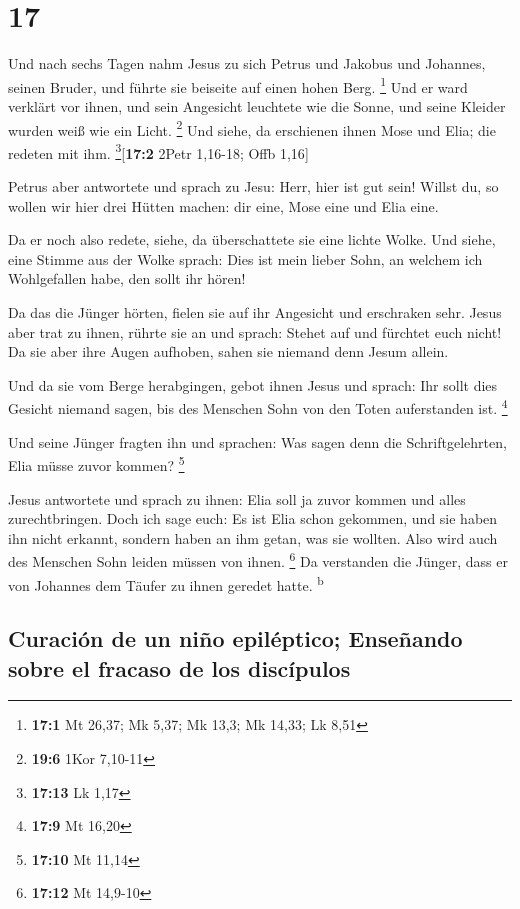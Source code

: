 \hypertarget{section-16}{%
\section{17}\label{section-16}}

 Und nach sechs Tagen nahm Jesus zu sich Petrus und
Jakobus und Johannes, seinen Bruder, und führte sie beiseite auf einen
hohen Berg. \footnote{\textbf{17:1} Mt 26,37; Mk 5,37; Mk 13,3; Mk
  14,33; Lk 8,51}  Und er ward verklärt vor ihnen, und
sein Angesicht leuchtete wie die Sonne, und seine Kleider wurden weiß
wie ein Licht. \footnote{\textbf{19:6} 1Kor 7,10-11}  Und
siehe, da erschienen ihnen Mose und Elia; die redeten mit ihm.
\footnote{\textbf{17:13} Lk 1,17}{[}\textbf{17:2} 2Petr 1,16-18; Offb
1,16{]}

 Petrus aber antwortete und sprach zu Jesu: Herr, hier ist
gut sein! Willst du, so wollen wir hier drei Hütten machen: dir eine,
Mose eine und Elia eine.

 Da er noch also redete, siehe, da überschattete sie eine
lichte Wolke. Und siehe, eine Stimme aus der Wolke sprach: Dies ist mein
lieber Sohn, an welchem ich Wohlgefallen habe, den sollt ihr hören!

 Da das die Jünger hörten, fielen sie auf ihr Angesicht
und erschraken sehr.  Jesus aber trat zu ihnen, rührte sie
an und sprach: Stehet auf und fürchtet euch nicht!  Da sie
aber ihre Augen aufhoben, sahen sie niemand denn Jesum allein.

 Und da sie vom Berge herabgingen, gebot ihnen Jesus und
sprach: Ihr sollt dies Gesicht niemand sagen, bis des Menschen Sohn von
den Toten auferstanden ist. \footnote{\textbf{17:9} Mt 16,20}

 Und seine Jünger fragten ihn und sprachen: Was sagen
denn die Schriftgelehrten, Elia müsse zuvor kommen? \footnote{\textbf{17:10}
  Mt 11,14}

 Jesus antwortete und sprach zu ihnen: Elia soll ja zuvor
kommen und alles zurechtbringen.  Doch ich sage euch: Es
ist Elia schon gekommen, und sie haben ihn nicht erkannt, sondern haben
an ihm getan, was sie wollten. Also wird auch des Menschen Sohn leiden
müssen von ihnen. \footnote{\textbf{17:12} Mt 14,9-10} 
Da verstanden die Jünger, dass er von Johannes dem Täufer zu ihnen
geredet hatte. \textsuperscript{b}

\hypertarget{curaciuxf3n-de-un-niuxf1o-epiluxe9ptico-enseuxf1ando-sobre-el-fracaso-de-los-discuxedpulos}{%
\subsection{Curación de un niño epiléptico; Enseñando sobre el fracaso
de los
discípulos}\label{curaciuxf3n-de-un-niuxf1o-epiluxe9ptico-enseuxf1ando-sobre-el-fracaso-de-los-discuxedpulos}}

